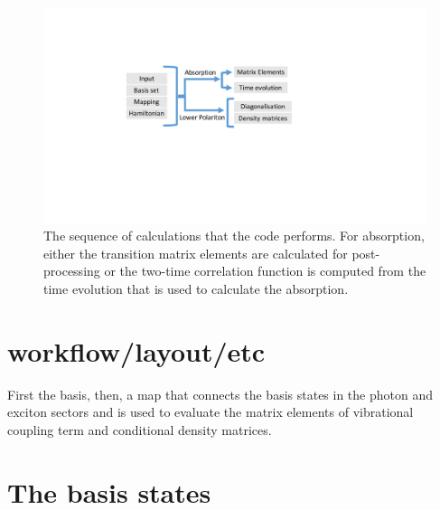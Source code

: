 \documentclass[final,twocolumn]{elsarticle}
\newcommand{\cntset}{\mathcal{P}_N}
\newcommand{\maptoN}{{{\mathcal{M}}}_{N-1 \mapsto N}}
\begin{document}
\begin{small}
  
\vspace{2cm}




\begin{figure}[t]
\centering
\includegraphics[width=0.8\columnwidth]{flow}
\caption{ The sequence of calculations %
that the code performs. %
For absorption, either the transition matrix elements are calculated for post-processing or
the two-time correlation function is computed from the time evolution that is used to calculate
the absorption.
 \label{fig:flow}
 }
\end{figure}



\section{workflow/layout/etc}
First the basis,
then,
a map that connects the basis states in the photon and exciton sectors and is used to evaluate the matrix elements of vibrational coupling term and conditional density matrices.






\section{The basis states}


\end{small}
\end{document}
